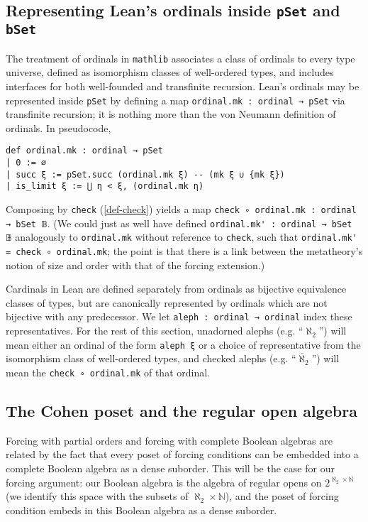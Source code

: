 \documentclass[a4paper,USenglish,cleveref, autoref]{lipics-v2019}
\newcommand{\lil}{\lstinline}
\theoremstyle{theorem}
\theoremstyle{definition}
\begin{document}
\subsection{Representing Lean's ordinals inside \lil{pSet} and \lil{bSet}}
The treatment of ordinals in \lil{mathlib} associates a class of ordinals to every type universe, defined as isomorphism classes of well-ordered types, and includes interfaces for both well-founded and transfinite recursion. Lean's ordinals may be represented inside \lil{pSet} by defining a map \lil{ordinal.mk : ordinal → pSet} via transfinite recursion; it is nothing more than the von Neumann definition of ordinals. In pseudocode,
\begin{lstlisting}
def ordinal.mk : ordinal → pSet
| 0 := ∅
| succ ξ := pSet.succ (ordinal.mk ξ) -- (mk ξ ∪ {mk ξ})
| is_limit ξ := ⋃ η < ξ, (ordinal.mk η)
\end{lstlisting}
Composing by \lil{check} (\autoref{def-check}) yields a map \lil{check ∘ ordinal.mk : ordinal → bSet 𝔹}. (We could just as well have defined \lstinline{ordinal.mk' : ordinal → bSet 𝔹} analogously to \lstinline{ordinal.mk} without reference to \lil{check}, such that \lstinline{ordinal.mk' = check ∘ ordinal.mk}; the point is that there is a link between the metatheory's notion of size and order with that of the forcing extension.)

Cardinals in Lean are defined separately from ordinals as bijective equivalence classes of types, but are canonically represented by ordinals which are not bijective with any predecessor. We let \lil{aleph : ordinal → ordinal} index these representatives. For the rest of this section, unadorned alephs (e.g. ``$\aleph_2$'') will mean either an ordinal of the form \lil{aleph ξ} or a choice of representative from the isomorphism class of well-ordered types, and checked alephs (e.g. ``$\check{\aleph_2}$'') will mean the \lil{check ∘ ordinal.mk} of that ordinal.

\subsection{The Cohen poset and the regular open algebra}
Forcing with partial orders and forcing with complete Boolean algebras are related by the fact that every poset of forcing conditions can be embedded into a complete Boolean algebra as a dense suborder. This will be the case for our forcing argument: our Boolean algebra is the algebra of regular opens on $2^{\aleph_2 \times \mathbb{N}}$ (we identify this space with the subsets of $\aleph_2 \times \mathbb{N}$), and the poset of forcing condition embeds in this Boolean algebra as a dense suborder.
\end{document}
